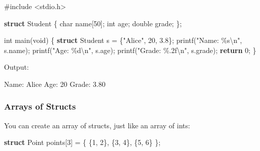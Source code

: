 \documentclass[
  letterpaper,
  DIV=11,
  numbers=noendperiod]{scrreprt}
\newenvironment{Shaded}{\begin{snugshade}}{\end{snugshade}}
\newcommand{\ControlFlowTok}[1]{\textcolor[rgb]{0.00,0.23,0.31}{\textbf{#1}}}
\newcommand{\DataTypeTok}[1]{\textcolor[rgb]{0.68,0.00,0.00}{#1}}
\newcommand{\DecValTok}[1]{\textcolor[rgb]{0.68,0.00,0.00}{#1}}
\newcommand{\ExtensionTok}[1]{\textcolor[rgb]{0.00,0.23,0.31}{#1}}
\newcommand{\FloatTok}[1]{\textcolor[rgb]{0.68,0.00,0.00}{#1}}
\newcommand{\ImportTok}[1]{\textcolor[rgb]{0.00,0.46,0.62}{#1}}
\newcommand{\KeywordTok}[1]{\textcolor[rgb]{0.00,0.23,0.31}{\textbf{#1}}}
\newcommand{\NormalTok}[1]{\textcolor[rgb]{0.00,0.23,0.31}{#1}}
\newcommand{\OperatorTok}[1]{\textcolor[rgb]{0.37,0.37,0.37}{#1}}
\newcommand{\PreprocessorTok}[1]{\textcolor[rgb]{0.68,0.00,0.00}{#1}}
\newcommand{\SpecialCharTok}[1]{\textcolor[rgb]{0.37,0.37,0.37}{#1}}
\newcommand{\StringTok}[1]{\textcolor[rgb]{0.13,0.47,0.30}{#1}}
\begin{document}
\begin{Shaded}
\begin{Highlighting}[]
\PreprocessorTok{\#include }\ImportTok{\textless{}stdio.h\textgreater{}}

\KeywordTok{struct}\NormalTok{ Student }\OperatorTok{\{}
    \DataTypeTok{char}\NormalTok{ name}\OperatorTok{[}\DecValTok{50}\OperatorTok{];}
    \DataTypeTok{int}\NormalTok{ age}\OperatorTok{;}
    \DataTypeTok{double}\NormalTok{ grade}\OperatorTok{;}
\OperatorTok{\};}

\DataTypeTok{int}\NormalTok{ main}\OperatorTok{(}\DataTypeTok{void}\OperatorTok{)} \OperatorTok{\{}
    \KeywordTok{struct}\NormalTok{ Student s }\OperatorTok{=} \OperatorTok{\{}\StringTok{"Alice"}\OperatorTok{,} \DecValTok{20}\OperatorTok{,} \FloatTok{3.8}\OperatorTok{\};}
\NormalTok{    printf}\OperatorTok{(}\StringTok{"Name: }\SpecialCharTok{\%s\textbackslash{}n}\StringTok{"}\OperatorTok{,}\NormalTok{ s}\OperatorTok{.}\NormalTok{name}\OperatorTok{);}
\NormalTok{    printf}\OperatorTok{(}\StringTok{"Age: }\SpecialCharTok{\%d\textbackslash{}n}\StringTok{"}\OperatorTok{,}\NormalTok{ s}\OperatorTok{.}\NormalTok{age}\OperatorTok{);}
\NormalTok{    printf}\OperatorTok{(}\StringTok{"Grade: }\SpecialCharTok{\%.2f\textbackslash{}n}\StringTok{"}\OperatorTok{,}\NormalTok{ s}\OperatorTok{.}\NormalTok{grade}\OperatorTok{);}
    \ControlFlowTok{return} \DecValTok{0}\OperatorTok{;}
\OperatorTok{\}}
\end{Highlighting}
\end{Shaded}

Output:

\begin{Shaded}
\begin{Highlighting}[]
\ExtensionTok{Name:}\NormalTok{ Alice}
\ExtensionTok{Age:}\NormalTok{ 20}
\ExtensionTok{Grade:}\NormalTok{ 3.80}
\end{Highlighting}
\end{Shaded}

\subsubsection{Arrays of Structs}\label{arrays-of-structs}

You can create an array of structs, just like an array of ints:

\begin{Shaded}
\begin{Highlighting}[]
\KeywordTok{struct}\NormalTok{ Point points}\OperatorTok{[}\DecValTok{3}\OperatorTok{]} \OperatorTok{=} \OperatorTok{\{}
    \OperatorTok{\{}\DecValTok{1}\OperatorTok{,} \DecValTok{2}\OperatorTok{\},}
    \OperatorTok{\{}\DecValTok{3}\OperatorTok{,} \DecValTok{4}\OperatorTok{\},}
    \OperatorTok{\{}\DecValTok{5}\OperatorTok{,} \DecValTok{6}\OperatorTok{\}}
\OperatorTok{\};}
\end{Highlighting}
\end{Shaded}
\end{document}
